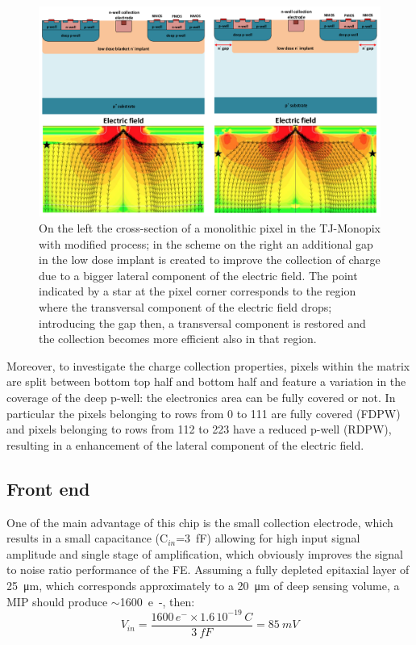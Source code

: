     \begin{figure}[h!]
        \centering
        \includegraphics[width=.9\linewidth]{figures/Monopix1/Monopix1_section_scheme.png}
        \caption{On the left the cross-section of a monolithic pixel in the TJ-Monopix with modified process; in the scheme on the right an additional gap in the low dose implant is created to improve the collection of charge due to a bigger lateral component of the electric field. The point indicated by a star at the pixel corner corresponds to the region where the transversal component of the electric field drops; introducing the gap then, a transversal component is restored and the collection becomes more efficient also in that region. }
        \label{fig:Monopix1_section_scheme}
    \end{figure}

    Moreover, to investigate the charge collection properties, pixels within the matrix are split between bottom top half and bottom half and feature a variation in the coverage of the deep p-well: the electronics area can be fully covered or not. In particular the pixels belonging to rows from 0 to 111 are fully covered (FDPW) and pixels belonging to rows from 112 to 223 have a reduced p-well (RDPW), resulting in a enhancement of the lateral component of the electric field.

    \subsection{Front end}\label{sec:ALPIDE-like}
        One of the main advantage of this chip is the small collection electrode, which results in a small capacitance (C$_{in}$=\SI{3}{fF}) allowing for high input signal amplitude and single stage of amplification, which obviously improves the signal to noise ratio performance of the FE. Assuming a fully depleted epitaxial layer of \SI{25}{\um}, which corresponds approximately to a \SI{20}{\um} of deep sensing volume, a MIP should produce $\sim$\SI{1600}{e-}, then:
        \begin{equation}
            V_{in} = \frac{1600\,e^-\times1.6\,10^{-19}\,\si{C} }{\SI{3}{fF}} = \SI{85}{mV}
        \end{equation}


